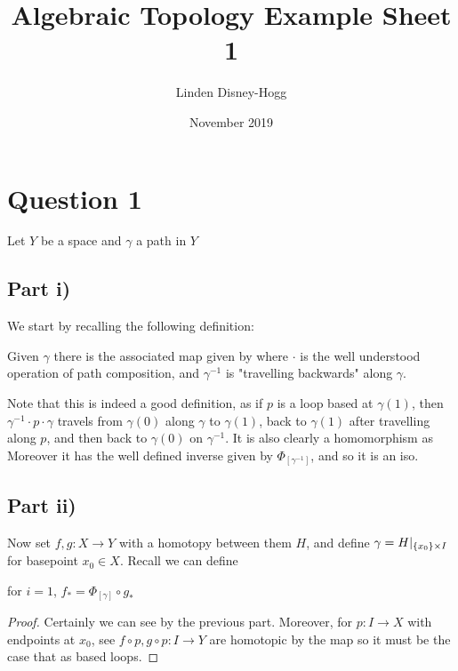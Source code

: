 \documentclass{article}
\title{Algebraic Topology Example Sheet 1}
\author{Linden Disney-Hogg}
\date{November 2019}
\begin{document}
\maketitle
\tableofcontents

\section{Question 1}
Let $Y$ be a space and $\gamma$ a path in $Y$
\subsection{Part i)}
We start by recalling the following definition:
\begin{definition}
Given $\gamma$ there is the associated map 
given by 
where $\cdot$ is the well understood operation of path composition, and $\gamma^{-1}$ is "travelling backwards" along $\gamma$. 
\end{definition}
Note that this is indeed a good definition, as if $p$ is a loop based at $\gamma(1)$, then $\gamma^{-1} \cdot p \cdot \gamma$ travels from $\gamma(0)$ along $\gamma$ to $\gamma(1)$, back to $\gamma(1)$ after travelling along $p$, and then back to $\gamma(0)$ on $\gamma^{-1}$. It is also clearly a homomorphism as
Moreover it has the well defined inverse given by $\Phi_{[\gamma^{-1}]}$, and so it is an iso. 

\subsection{Part ii)}
Now set $f,g : X \to Y$ with a homotopy between them $H$, and define $\gamma = H \rvert_{\left\{ x_0 \right\} \times I}$ for basepoint $x_0 \in X$. Recall we can define 
\begin{lemma}
for $i=1$, $f_\ast = \Phi_{[\gamma]} \circ g_\ast$
\end{lemma}
\begin{proof}
Certainly we can see 
by the previous part. Moreover, for $p:I \to X$ with endpoints at $x_0$, see $f\circ p, g \circ p : I \to Y$ are homotopic by the map 
so it must be the case that 
as based loops.  
\end{proof}
\end{document}
